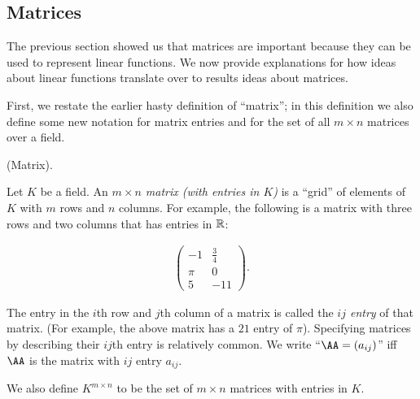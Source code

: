 \newpage

\subsection*{Matrices}

The previous section showed us that matrices are important because they can be used to represent linear functions. We now provide explanations for how ideas about linear functions translate over to results ideas about matrices.

First, we restate the earlier hasty definition of ``matrix''; in this definition we also define some new notation for matrix entries and for the set of all $m \times n$ matrices over a field.

\begin{defn}
    (Matrix).
    
    Let $K$ be a field. An \textit{$m \times n$ matrix (with entries in $K$)} is a ``grid'' of elements of $K$ with $m$ rows and $n$ columns. For example, the following is a matrix with three rows and two columns that has entries in $\mathbb{R}$:
    
    \begin{align*}
        \begin{pmatrix}
            -1 & \frac{3}{4} \\
            \pi & 0 \\
            5 & -11
        \end{pmatrix}.
    \end{align*}
    
    The entry in the $i$th row and $j$th column of a matrix is called the \textit{$ij$ entry} of that matrix. (For example, the above matrix has a $21$ entry of $\pi$). Specifying matrices by describing their $ij$th entry is relatively common. We write ``$\AA = (a_{ij})$'' iff $\AA$ is the matrix with $ij$ entry $a_{ij}$.
    
    We also define $K^{m \times n}$ to be the set of $m \times n$ matrices with entries in $K$.
\end{defn}

